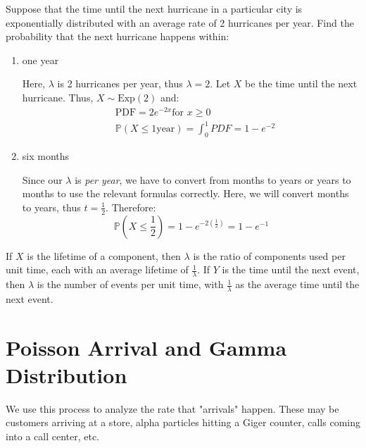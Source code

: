 \documentclass[titlepage, 12pt, leqno]{article}
\begin{document}
\begin{ex}
    Suppose that the time until the next hurricane in a particular city is
    exponentially distributed with an average rate of 2 hurricanes per year. Find
    the probability that the next hurricane happens within:
    \vspace{10px}
    
    \begin{enumerate}
        \item one year
            \vspace{10px}

            Here, $\lambda$ is 2 hurricanes per year, thus $\lambda = 2$. Let $X$
            be the time until the next hurricane. Thus, $X \sim \text{Exp}(2)$
            and:
           \begin{align*}
               &\text{PDF} = 2e^{-2x} \text{for } x \ge 0 \\
               &\mathbb{P}(X\le 1 \text{year}) = \int_{0}^{1}PDF =
               \boxed{1 - e^{-2}} 
           \end{align*}
        \item six months
            \vspace{10px}

            Since our $\lambda$ is \textit{per year}, we have to convert from
            months to years or years to months to use the relevant formulas
            correctly. Here, we will convert months to years, thus $t =
            \frac{1}{2}$. Therefore:
            \[
                    \mathbb{P}(X\le \frac{1}{2}) =
                    1 - e^{-2\left(\frac{1}{2}\right)} = \boxed{1 - e^{-1}} 
            \]
    \end{enumerate}
\end{ex}

If $X$ is the lifetime of a component, then $\lambda$ is the ratio of 
components used per unit time, each with an average lifetime of 
$\frac{1}{\lambda}$. If $Y$ is the time until the next event, then $\lambda$ is
the number of events per unit time, with $\frac{1}{\lambda}$ as the average
time until the next event.

\pagebreak
\section{Poisson Arrival and Gamma Distribution}
We use this process to analyze the rate that "arrivals" happen. These may be
customers arriving at a store, alpha particles hitting a Giger counter, calls
coming into a call center, etc. 
\end{document}
